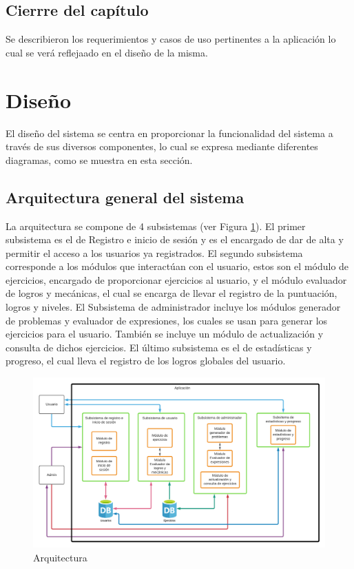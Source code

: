 \documentclass{article}
\begin{document}
\subsection{Cierrre del capítulo}
Se describieron los requerimientos y casos de uso pertinentes a la aplicación lo cual se verá reflejaado en el diseño de la misma.
\pagebreak
\section{Diseño}
El diseño del sistema se centra en proporcionar la funcionalidad del sistema a través de sus diversos componentes, lo cual se expresa mediante diferentes diagramas, como se muestra en esta sección.
\subsection{Arquitectura general del sistema}%
La arquitectura se compone de 4 subsistemas (ver Figura \ref{fig:diseno_01}). El primer subsistema es el de Registro e inicio de sesión y es el encargado de dar de alta y permitir el acceso a los usuarios ya registrados. El segundo subsistema corresponde a los módulos que interactúan con el usuario, estos son el módulo de ejercicios, encargado de proporcionar ejercicios al usuario, y el módulo evaluador de logros y mecánicas, el cual se encarga de llevar el registro de la puntuación, logros y niveles. El Subsistema de administrador incluye los módulos generador de problemas y evaluador de expresiones, los cuales se usan para generar los ejercicios para el usuario. También se incluye un módulo de actualización y consulta de dichos ejercicios. El último subsistema es el de estadísticas y progreso, el cual lleva el registro de los logros globales del usuario.  
\begin{figure}[H]
    \centering
    \includegraphics[scale=0.65]{imgs/Arquitectura}
    \caption{Arquitectura}
    \label{fig:diseno_01}
\end{figure}
\end{document}
